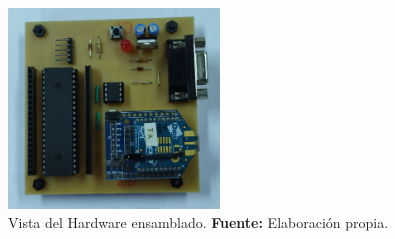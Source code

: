 \begin{figure}[H]
	\centering
	\includegraphics[width=0.5\textwidth]{./Cap4imagen/cto_ensamblado_4.jpg}
	\caption[Vista del Hardware ensamblado.]{Vista del Hardware ensamblado.\textbf{ Fuente:} Elaboración propia.}
	\label{Esch10} %
\end{figure}






